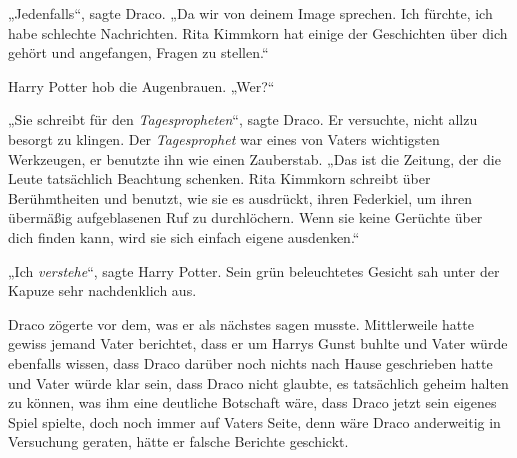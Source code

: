 „Jedenfalls“, sagte Draco.
„Da wir von deinem Image sprechen. Ich fürchte, ich habe schlechte Nachrichten. Rita Kimmkorn hat einige der Geschichten über dich gehört und angefangen, Fragen zu stellen.“

Harry Potter hob die Augenbrauen.
„Wer?“

„Sie schreibt für den \emph{Tagespropheten}“, sagte Draco. Er versuchte, nicht allzu besorgt zu klingen. Der \emph{Tagesprophet} war eines von Vaters wichtigsten Werkzeugen, er benutzte ihn wie einen Zauberstab.
„Das ist die Zeitung, der die Leute tatsächlich Beachtung schenken. Rita Kimmkorn schreibt über Berühmtheiten und benutzt, wie sie es ausdrückt, ihren Federkiel, um ihren übermäßig aufgeblasenen Ruf zu durchlöchern. Wenn sie keine Gerüchte über dich finden kann, wird sie sich einfach eigene ausdenken.“

„Ich \emph{verstehe}“, sagte Harry Potter. Sein grün beleuchtetes Gesicht sah unter der Kapuze sehr nachdenklich aus.

Draco zögerte vor dem, was er als nächstes sagen musste. Mittlerweile hatte gewiss jemand Vater berichtet, dass er um Harrys Gunst buhlte und Vater würde ebenfalls wissen, dass Draco darüber noch nichts nach Hause geschrieben hatte und Vater würde klar sein, dass Draco nicht glaubte, es tatsächlich geheim halten zu können, was ihm eine deutliche Botschaft wäre, dass Draco jetzt sein eigenes Spiel spielte, doch noch immer auf Vaters Seite, denn wäre Draco anderweitig in Versuchung geraten, hätte er falsche Berichte geschickt.

